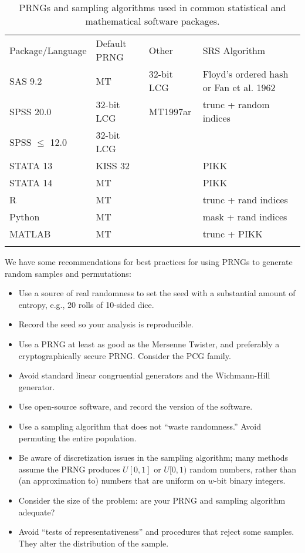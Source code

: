 \documentclass[graybox]{svmult}
\begin{document}
\begin{table}
\caption{PRNGs and sampling algorithms used in common statistical and mathematical software packages.}
\label{tab:software}      
\begin{tabular}[h]{p{2.5cm}p{2.4cm}p{2.5cm}p{4cm}}
\hline\noalign{\smallskip}
Package/Language & Default PRNG & Other & SRS Algorithm  \\
\noalign{\smallskip}\svhline\noalign{\smallskip}
SAS 9.2              & MT         	& 32-bit LCG & Floyd's ordered hash or Fan et al. 1962 \\
SPSS 20.0          & 32-bit LCG  & MT1997ar  & trunc + random indices \\
SPSS $\le$ 12.0 & 32-bit LCG  &         &                \\
STATA 13            & KISS 32      &         & PIKK           \\
STATA 14            & MT              &         & PIKK           \\
R                         & MT              &         & trunc + rand indices \\
Python                 & MT             &         & mask + rand indices  \\
MATLAB              & MT             &         & trunc + PIKK         \\
\noalign{\smallskip}\hline\noalign{\smallskip}
\end{tabular}
\end{table}


We have some recommendations for best practices for using PRNGs to generate random samples and permutations:
\begin{itemize}
\item Use a source of real randomness to set the seed with a substantial amount of entropy, e.g., 20 rolls of 10-sided dice.
\item Record the seed so your analysis is reproducible.
\item Use a PRNG at least as good as the Mersenne Twister, and preferably a cryptographically secure PRNG. Consider the PCG family. 
\item Avoid standard linear congruential generators and the Wichmann-Hill generator.
\item Use open-source software, and record the version of the software.
\item Use a sampling algorithm that does not ``waste randomness.'' Avoid permuting the entire population.
\item Be aware of discretization issues in the sampling algorithm; many methods assume the PRNG produces $U[0,1]$ or $U[0,1)$ random numbers, rather than (an approximation to) numbers that are uniform on $w$-bit binary integers.
\item Consider the size of the problem: are your PRNG and sampling algorithm adequate?
\item Avoid ``tests of representativeness'' and procedures that reject some samples. They alter the distribution of the sample.
\end{itemize}
\end{document}
